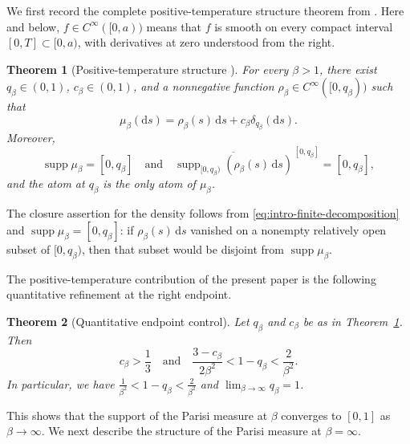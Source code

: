 \documentclass[10pt]{amsart}
\newtheorem{theorem}{Theorem}[section]
\theoremstyle{definition}
\theoremstyle{remark}
\numberwithin{equation}{section}
\newcommand{\1}{\mathbf 1}
\newcommand{\supp}{\operatorname{supp}}
\newcommand{\dd}{\,\mathrm d}
\begin{document}
We first record the complete positive-temperature structure theorem from \cite[Theorem~1.1]{Lopatto2026}. Here and below, $f\in C^\infty([0,a))$ means that $f$ is smooth on every compact interval $[0,T]\subset[0,a)$, with derivatives at zero understood from the right.

\begin{theorem}[Positive-temperature structure \cite{Lopatto2026}]
\label{thm:finite-temperature-structure}
For every $\beta>1$, there exist $q_\beta\in(0,1)$, $c_\beta\in(0,1)$, and a nonnegative function $\rho_\beta\in C^\infty([0,q_\beta))$ such that
\begin{equation}
 \mu_\beta(\mathrm d s)=\rho_\beta(s)\dd s+c_\beta\delta_{q_\beta}(\mathrm d s).
 \label{eq:intro-finite-decomposition}
\end{equation}
Moreover,
\begin{equation*}
 \supp\mu_\beta=[0,q_\beta]
 \quad\text{and}\quad
 \overline{\supp_{[0,q_\beta)}(\rho_\beta(s)\dd s)}^{\,[0,q_\beta]}=[0,q_\beta],
\end{equation*}
and the atom at $q_\beta$ is the only atom of $\mu_\beta$.
\end{theorem}

The closure assertion for the density follows from \eqref{eq:intro-finite-decomposition} and $\supp\mu_\beta=[0,q_\beta]$: if $\rho_\beta(s)\dd s$ vanished on a nonempty relatively open subset of $[0,q_\beta)$, then that subset would be disjoint from $\supp\mu_\beta$.

The positive-temperature contribution of the present paper is the following quantitative refinement at the right endpoint.

\begin{theorem}[Quantitative endpoint control]
\label{thm:finite-temperature}
Let $q_\beta$ and $c_\beta$ be as in Theorem~\ref{thm:finite-temperature-structure}.  Then
\begin{equation}
 c_\beta>\frac13
 \quad\text{and}\quad
 \frac{3-c_\beta}{2\beta^2}<1-q_\beta<\frac2{\beta^2}.
 \label{eq:intro-finite-endpoint-bounds}
\end{equation}
In particular, we have $\frac1{\beta^2}<1-q_\beta<\frac2{\beta^2}$ and $\lim_{\beta\to\infty}q_\beta=1$.
\end{theorem}

This shows that the support of the Parisi measure at $\beta$ converges to $[0,1]$ as $\beta\to\infty$. We next describe the structure of the Parisi measure at $\beta=\infty$.
\end{document}
